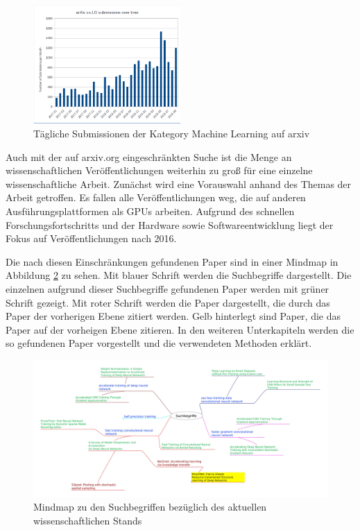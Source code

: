 \begin{figure}[h]
 \centering
 \includegraphics[width=0.5\textwidth]{KapitelPartA/images/arxiv.png}
 \caption{Tägliche Submissionen der Kategory Machine Learning auf arxiv \cite{cornell}}
 \label{abb:arxiv}
\end{figure}


Auch mit der auf arxiv.org eingeschränkten Suche ist die Menge an wissenschaftlichen Veröffentlichungen weiterhin zu groß für eine einzelne wissenschaftliche Arbeit. Zunächst wird eine Vorauswahl anhand des Themas der Arbeit getroffen. Es fallen alle Veröffentlichungen weg, die auf anderen Ausführungsplattformen als GPUs arbeiten. Aufgrund des schnellen Forschungsfortschritts und der Hardware sowie Softwareentwicklung liegt der Fokus auf Veröffentlichungen nach 2016.

Die nach diesen Einschränkungen gefundenen Paper sind in einer Mindmap in Abbildung \ref{abb:mindmap} zu sehen. Mit blauer Schrift werden die Suchbegriffe dargestellt. Die einzelnen aufgrund dieser Suchbegriffe gefundenen Paper werden mit grüner Schrift gezeigt. Mit roter Schrift werden die Paper dargestellt, die durch das Paper der vorherigen Ebene zitiert werden. Gelb hinterlegt sind Paper, die das Paper auf der vorheigen Ebene zitieren. In den weiteren Unterkapiteln werden die so gefundenen Paper vorgestellt und die verwendeten Methoden erklärt. 

\begin{figure}[h]
 \centering
 \includegraphics[width=1\textwidth]{KapitelPartA/images/mindmap.jpg}
 \caption{Mindmap zu den Suchbegriffen bezüglich des aktuellen wissenschaftlichen Stands}
 \label{abb:mindmap}
\end{figure}


